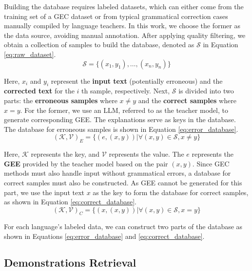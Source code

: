 Building the database requires labeled datasets, which can either come from the training set of a GEC dataset or from typical grammatical correction cases manually compiled by language teachers. In this work, we choose the former as the data source, avoiding manual annotation. After applying quality filtering, we obtain a collection of samples to build the database, denoted as $\mathcal{S}$ in Equation \ref{eq:raw_dataset}.
\begin{equation}
\mathcal{S} = \{ ( x_1, y_1 ), \dots , ( x_n, y_n ) \}
\label{eq:raw_dataset}
\end{equation}

Here, $x_i$ and $y_i$ represent the \textbf{input text} (potentially erroneous) and the \textbf{corrected text} for the $i$ th sample, respectively. Next, $\mathcal{S}$ is divided into two parts: the \textbf{erroneous samples} where $x \ne y$ and the \textbf{correct samples} where $x = y$. For the former, we use an LLM, referred to as the teacher model, to generate corresponding GEE. The explanations serve as keys in the database. The database for erroneous samples is shown in Equation \ref{eq:error_database}.
\begin{equation}
(\mathcal{K},  \mathcal{V})_E  = \{ \left( e, \left(x, y \right) \right) | \forall (x, y) \in \mathcal{S}, x \ne y \}
\label{eq:error_database}
\end{equation}

Here, $\mathcal{K}$ represents the key, and $\mathcal{V}$ represents the value. The $e$ represents the \textbf{GEE} provided by the teacher model based on the pair $(x, y)$. Since GEC methods must also handle input without grammatical errors, a database for correct samples must also be constructed. As GEE cannot be generated for this part, we use the input text $x$ as the key to form the database for correct samples, as shown in Equation \ref{eq:correct_database}.
\begin{equation}
( \mathcal{K}, \mathcal{V})_C = \{ \left( x, (x, y) \right) | \forall (x, y) \in \mathcal{S}, x = y \}
\label{eq:correct_database}
\end{equation}

For each language's labeled data, we can construct two parts of the database as shown in Equations \ref{eq:error_database} and \ref{eq:correct_database}.

\subsection{Demonstrations Retrieval}

